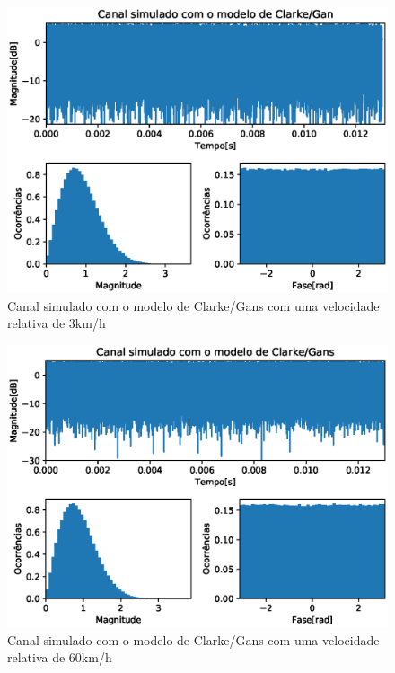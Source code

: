 \documentclass[journal,11pt,twocolumn]{IEEEtran}
\begin{document}
\begin{figure}[h!]
    \centering
    \includegraphics[scale=0.55]{gans_003kmh.eps}
    \caption{Canal simulado com o modelo de Clarke/Gans com uma velocidade relativa de 3km/h}
    \label{fig:gans-3km-h}
\end{figure}
\begin{figure}[h!]
    \centering
    \includegraphics[scale=0.55]{gans_060kmh.eps}
    \caption{Canal simulado com o modelo de Clarke/Gans com uma velocidade relativa de 60km/h}
    \label{fig:gans-60km-h}
\end{figure}
\end{document}
